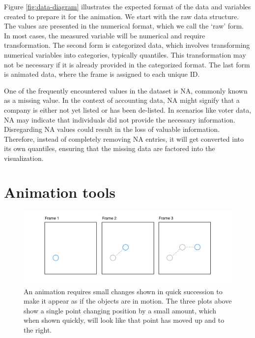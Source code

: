 Figure \ref{fig:data-diagram} illustrates the expected format of the data and variables created to prepare it for the animation. We start with the raw data structure. The values are presented in the numerical format, which we call the `raw' form. In most cases, the measured variable will be numerical and require transformation. The second form is categorized data, which involves transforming numerical variables into categories, typically quantiles. This transformation may not be necessary if it is already provided in the categorized format. The last form is animated data, where the frame is assigned to each unique ID.

One of the frequently encountered values in the dataset is NA, commonly known as a missing value. In the context of accounting data, NA might signify that a company is either not yet listed or has been de-listed. In scenarios like voter data, NA may indicate that individuals did not provide the necessary information. Disregarding NA values could result in the loss of valuable information. Therefore, instead of completely removing NA entries, it will get converted into its own quantiles, ensuring that the missing data are factored into the visualization.

\section{Animation tools}\label{animation}

\begin{figure}

{\centering \includegraphics[width=1\linewidth]{figures/animation-diagram} 

}

\caption{An animation requires small changes shown in quick succession to make it appear as if the objects are in motion. The three plots above show a single point changing position by a small amount, which when shown quickly, will look like that point has moved up and to the right.}\label{fig:animation-diagram}
\end{figure}

